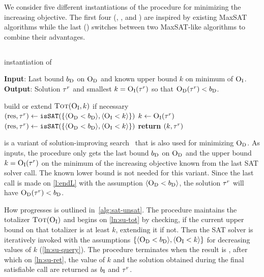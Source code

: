 We consider five different instantiations of the \Min{} procedure for minimizing the increasing objective.
The first four (\satunsat{}, \unsatsat{}, \msu{} and \oll{}) are inspired by existing MaxSAT algorithms while the last (\msh{}) switches between two MaxSAT-like algorithms to combine their advantages.


\subsection{\satunsat{}\label{sec:sat-unsat}}

\begin{algorithm}[t]
  \caption{\satunsat{} instantiation of \Min{}}\label{alg:sat-unsat}
  \textbf{Input}: Last bound $b_{\text{D}}$ on $\textsc{O}_{\text{D}}$ and known upper bound $k$ on minimum of $\textsc{O}_{\text{I}}$. \\
  \textbf{Output}: Solution $\tau^r$ and smallest $k=\textsc{O}_{\text{I}}(\tau^r)$ so that $\textsc{O}_{\text{D}}(\tau^r)<b_{\text{D}}$.

  \begin{algorithmic}[1]
    \STATE build or extend $\textsc{Tot}(\textsc{O}_{\text{I}},k)$ if necessary \label{ln:su-tot}
    \STATE $(\text{res},\tau^r) \gets \texttt{isSAT}(\{\langle \textsc{O}_{\text{D}} < b_{\text{D}} \rangle, \langle \textsc{O}_{\text{I}} < k \rangle\})$
    \WHILE{$\res = \sat$}
      \STATE $k \gets \textsc{O}_{\text{I}}(\tau^r)$
      \STATE $(\text{res},\tau^r) \gets \texttt{isSAT}(\{\langle \textsc{O}_{\text{D}} < b_{\text{D}} \rangle, \langle \textsc{O}_{\text{I}} < k \rangle\})$ \label{ln:su-query}
    \ENDWHILE
    \STATE \textbf{return} $(k,\tau^r)$ \label{ln:su-ret}
  \end{algorithmic}
\end{algorithm}

\satunsat{} is a variant of solution-improving search~\autocites{handbook2-maxsat,DBLP:journals/jsat/BerreP10,DBLP:journals/jsat/EenS06} that is also used for minimizing $\textsc{O}_{\text{D}}$. 
As inputs, the procedure only gets the last bound $b_{\text{D}}$ on $\textsc{O}_{\text{D}}$ and the upper bound $k=\textsc{O}_{\text{I}}(\tau^r)$ on the minimum of the increasing objective known from the last SAT solver call.
The known lower bound is not needed for this variant.
Since the last call is made on \cref{l:endL} with the assumption $\langle \textsc{O}_{\text{D}} < b_{\text{D}} \rangle$, the solution $\tau^r$ will have $\textsc{O}_{\text{D}}(\tau^r) < b_{\text{D}}$. 

How \satunsat{} progresses is outlined in~\cref{alg:sat-unsat}.
The procedure maintains the totalizer $\textsc{Tot}(\textsc{O}_{\text{I}})$ and begins on \cref{ln:su-tot} by checking, if the current upper bound on that totalizer is at least $k$, extending it if not. 
Then the SAT solver is iteratively invoked with the assumptions $\{\langle \textsc{O}_{\text{D}} < b_{\text{D}} \rangle, \langle \textsc{O}_{\text{I}} < k \rangle\}$ for decreasing values of $k$ (\cref{ln:su-query}).
The procedure terminates when the result is \unsat{}, after which on \cref{ln:su-ret}, the value of $k$ and the solution obtained during the final satisfiable call are returned as $b_{\text{I}}$ and $\tau^r$.  


